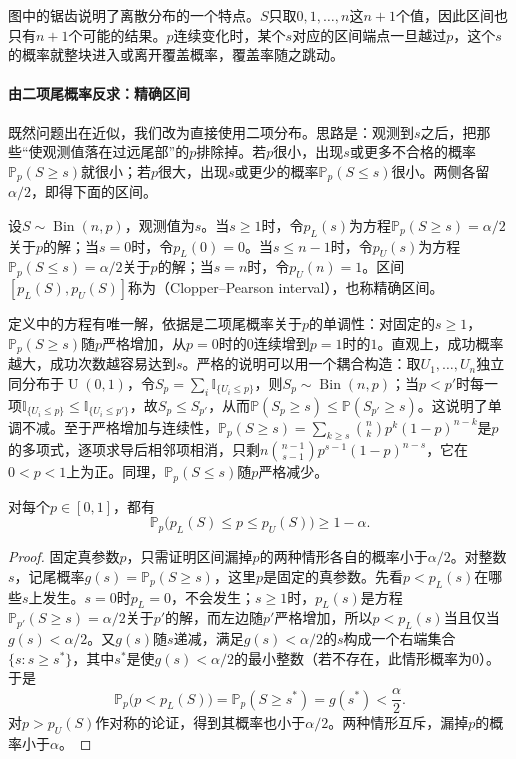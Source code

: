 图中的锯齿说明了离散分布的一个特点。$S$只取$0,1,\dots,n$这$n+1$个值，因此区间也只有$n+1$个可能的结果。$p$连续变化时，某个$s$对应的区间端点一旦越过$p$，这个$s$的概率就整块进入或离开覆盖概率，覆盖率随之跳动。

\paragraph{由二项尾概率反求：精确区间}

既然问题出在近似，我们改为直接使用二项分布。思路是：观测到$s$之后，把那些“使观测值落在过远尾部”的$p$排除掉。若$p$很小，出现$s$或更多不合格的概率$\mathbb P_p(S\geq s)$就很小；若$p$很大，出现$s$或更少的概率$\mathbb P_p(S\leq s)$很小。两侧各留$\alpha/2$，即得下面的区间。

\begin{definition}
\label{def:pred-clopper-pearson}
设$S\sim\operatorname{Bin}(n,p)$，观测值为$s$。当$s\geq1$时，令$p_L(s)$为方程$\mathbb P_p(S\geq s)=\alpha/2$关于$p$的解；当$s=0$时，令$p_L(0)=0$。当$s\leq n-1$时，令$p_U(s)$为方程$\mathbb P_p(S\leq s)=\alpha/2$关于$p$的解；当$s=n$时，令$p_U(n)=1$。区间$[p_L(S),p_U(S)]$称为（Clopper--Pearson interval），也称精确区间。
\end{definition}

定义中的方程有唯一解，依据是二项尾概率关于$p$的单调性：对固定的$s\geq1$，$\mathbb P_p(S\geq s)$随$p$严格增加，从$p=0$时的$0$连续增到$p=1$时的$1$。直观上，成功概率越大，成功次数越容易达到$s$。严格的说明可以用一个耦合构造：取$U_1,\dots,U_n$独立同分布于$\operatorname U(0,1)$，令$S_p=\sum_i\mathbb I_{\{U_i\leq p\}}$，则$S_p\sim\operatorname{Bin}(n,p)$；当$p<p'$时每一项$\mathbb I_{\{U_i\leq p\}}\leq\mathbb I_{\{U_i\leq p'\}}$，故$S_p\leq S_{p'}$，从而$\mathbb P(S_p\geq s)\leq\mathbb P(S_{p'}\geq s)$。这说明了单调不减。至于严格增加与连续性，$\mathbb P_p(S\geq s)=\sum_{k\geq s}\binom nk p^k(1-p)^{n-k}$是$p$的多项式，逐项求导后相邻项相消，只剩$n\binom{n-1}{s-1}p^{s-1}(1-p)^{n-s}$，它在$0<p<1$上为正。同理，$\mathbb P_p(S\leq s)$随$p$严格减少。

\begin{theorem}
\label{thm:pred-clopper-pearson-coverage}
对每个$p\in[0,1]$，都有
\[
 \mathbb P_p\bigl(p_L(S)\leq p\leq p_U(S)\bigr)\geq1-\alpha.
\]
\end{theorem}

\begin{proof}
固定真参数$p$，只需证明区间漏掉$p$的两种情形各自的概率小于$\alpha/2$。对整数$s$，记尾概率$g(s)=\mathbb P_p(S\geq s)$，这里$p$是固定的真参数。先看$p<p_L(s)$在哪些$s$上发生。$s=0$时$p_L=0$，不会发生；$s\geq1$时，$p_L(s)$是方程$\mathbb P_{p'}(S\geq s)=\alpha/2$关于$p'$的解，而左边随$p'$严格增加，所以$p<p_L(s)$当且仅当$g(s)<\alpha/2$。又$g(s)$随$s$递减，满足$g(s)<\alpha/2$的$s$构成一个右端集合$\{s:s\geq s^*\}$，其中$s^*$是使$g(s)<\alpha/2$的最小整数（若不存在，此情形概率为$0$）。于是
\[
 \mathbb P_p\bigl(p<p_L(S)\bigr)=\mathbb P_p(S\geq s^*)=g(s^*)<\frac\alpha2.
\]
对$p>p_U(S)$作对称的论证，得到其概率也小于$\alpha/2$。两种情形互斥，漏掉$p$的概率小于$\alpha$。
\end{proof}

